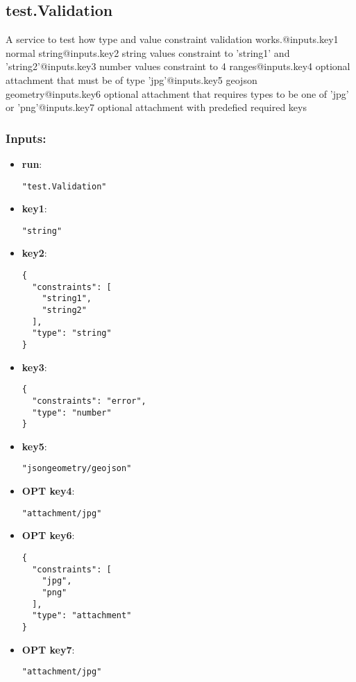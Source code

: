 \subsection{test.Validation}
A
 service to test how type and value constraint validation 
works.@inputs.key1 normal string@inputs.key2 string values constraint to
 'string1' and 'string2'@inputs.key3 number values constraint to 4 
ranges@inputs.key4 optional attachment that must be of type 
'jpg'@inputs.key5 geojson geometry@inputs.key6 optional attachment that 
requires types to be one of 'jpg' or 'png'@inputs.key7 optional 
attachment with predefied required keys
\subsubsection*{Inputs:}
\begin{itemize}
    \item \textbf{run}: 
\begin{lstlisting}
"test.Validation"
\end{lstlisting}
    \item \textbf{key1}: 
\begin{lstlisting}
"string"
\end{lstlisting}
    \item \textbf{key2}: 
\begin{lstlisting}
{
  "constraints": [
    "string1", 
    "string2"
  ], 
  "type": "string"
}
\end{lstlisting}
    \item \textbf{key3}: 
\begin{lstlisting}
{
  "constraints": "error", 
  "type": "number"
}
\end{lstlisting}
    \item \textbf{key5}: 
\begin{lstlisting}
"jsongeometry/geojson"
\end{lstlisting}
    \item \textbf{OPT key4}: 
\begin{lstlisting}
"attachment/jpg"
\end{lstlisting}
    \item \textbf{OPT key6}: 
\begin{lstlisting}
{
  "constraints": [
    "jpg", 
    "png"
  ], 
  "type": "attachment"
}
\end{lstlisting}
    \item \textbf{OPT key7}: 
\begin{lstlisting}
"attachment/jpg"
\end{lstlisting}
  \end{itemize}

